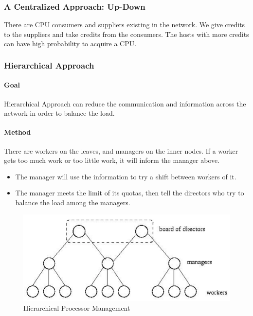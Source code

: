 \subsubsection{A Centralized Approach: Up-Down}
There are CPU consumers and suppliers existing in the network. We give credits to the suppliers and take credits from the consumers. The hosts with more credits can have high probability to acquire a CPU.

\subsubsection{Hierarchical Approach}
\paragraph{Goal}
Hierarchical Approach can reduce the communication and information across the network in order to balance the load. 

\paragraph{Method}
There are workers on the leaves, and managers on the inner nodes. If a worker gets too much work or too little work, it will inform the manager above.
\begin{itemize}
    \item The manager will use the information to try a shift between workers of it.
    \item The manager meets the limit of its quotas, then tell the directors who try to balance the load among the managers.
\end{itemize}

\begin{figure}
\centering
\includegraphics[width=\textwidth]{img/ch02-hier_proc.png}
\caption{Hierarchical Processor Management}
\label{fig:ch02-hier_proc}
\end{figure}

